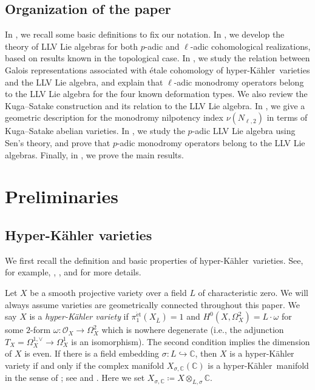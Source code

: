 \documentclass[12pt,reqno]{amsart}
\theoremstyle{definition}
\newcommand{\C}{{\mathds C}}
\newcommand{\et}{\mathrm{\acute{e}t}}
\newcommand{\hk}{hyper-Kähler~}
\newcommand{\cO}{\mathcal{O}}
\numberwithin{equation}{section}
\begin{document}
\subsection{Organization of the paper}

In , we recall some basic definitions to 
fix our notation.
In , we develop the theory of LLV Lie algebras for both $p$-adic and $\ell$-adic cohomological realizations, based on results known in the topological case.
In , we study the relation between Galois representations associated with étale cohomology of \hk varieties and the LLV Lie algebra, and explain that $\ell$-adic monodromy operators belong to the LLV Lie algebra for the four known deformation types.
We also review the Kuga--Satake construction and its relation to the LLV Lie algebra.
In , we give a geometric description for the monodromy nilpotency index $\nu(N_{\ell,2})$ in terms of Kuga--Satake abelian varieties.
In ,
we study the $p$-adic LLV Lie algebra using Sen's theory, and prove that $p$-adic monodromy operators belong to the LLV Lie algebras.
Finally, in , we prove the main results.


\section{Preliminaries}\label{Section:Preliminaries on Hk varieties}

\subsection{Hyper-Kähler varieties}\label{subsection:hyperkahler varieties}

We first recall the definition and basic properties of \hk varieties.
See, for example, \cite{HuybrechtsLecture}, \cite{Bindt}, and \cite{FLTZ22} for more details.

Let $X$ be a smooth projective variety over a field $L$ of characteristic zero.
We will always assume varieties are geometrically connected throughout this paper.
We say $X$ is a \emph{hyper-Kähler variety} if
$\pi_1^{\et} (X_{\overline{L}}) =1$
and $H^0 (X, \Omega^2_{X})=L \cdot  \omega$ for some $2$-form $\omega \colon \cO_X \to \Omega^2_{X}$ which is nowhere degenerate (i.e., the adjunction
$
T_{X} = \Omega_{X}^{1,\vee} \to \Omega_{X}^1
$
is an isomorphism).
The second condition implies the dimension of $X$ is even.
If there is a field embedding
$\sigma \colon L \hookrightarrow \C$,
then $X$ is a hyper-Kähler variety if and only if
the complex manifold
$X_{\sigma,\C}(\C)$
is a \hk manifold in the sense of \cite{HuybrechtsLecture}; see \cite[Lemma 3.1.3]{Bindt} and \cite[Section 2]{FLTZ22}.
Here we set $X_{\sigma,\C}\coloneqq X \otimes_{L,\sigma} \C$.
\end{document}
